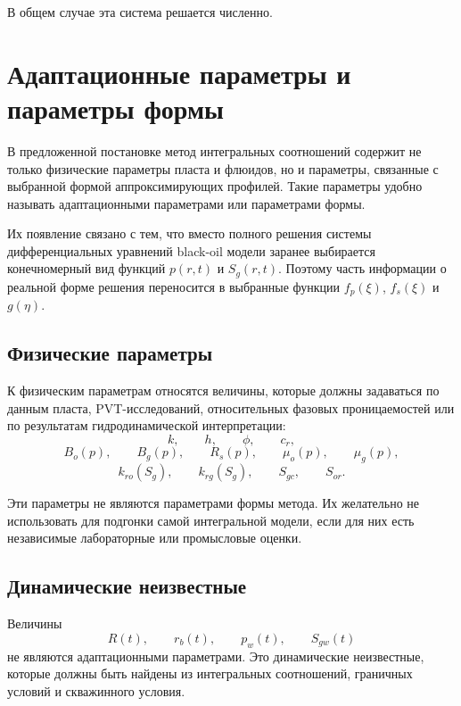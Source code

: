\documentclass[12pt,a4paper]{article}
\begin{document}
В общем случае эта система решается численно.


\section{Адаптационные параметры и параметры формы}

В предложенной постановке метод интегральных соотношений содержит не только физические параметры пласта и флюидов, но и параметры, связанные с выбранной формой аппроксимирующих профилей. Такие параметры удобно называть адаптационными параметрами или параметрами формы.

Их появление связано с тем, что вместо полного решения системы дифференциальных уравнений black-oil модели заранее выбирается конечномерный вид функций $p(r,t)$ и $S_g(r,t)$. Поэтому часть информации о реальной форме решения переносится в выбранные функции $f_p(\xi)$, $f_s(\xi)$ и $g(\eta)$.

\subsection{Физические параметры}

К физическим параметрам относятся величины, которые должны задаваться по данным пласта, PVT-исследований, относительных фазовых проницаемостей или по результатам гидродинамической интерпретации:
\begin{equation}
    k, \qquad h, \qquad \phi, \qquad c_r,
\end{equation}
\begin{equation}
    B_o(p), \qquad B_g(p), \qquad R_s(p), \qquad \mu_o(p), \qquad \mu_g(p),
\end{equation}
\begin{equation}
    k_{ro}(S_g), \qquad k_{rg}(S_g), \qquad S_{gc}, \qquad S_{or}.
\end{equation}

Эти параметры не являются параметрами формы метода. Их желательно не использовать для подгонки самой интегральной модели, если для них есть независимые лабораторные или промысловые оценки.

\subsection{Динамические неизвестные}

Величины
\begin{equation}
    R(t), \qquad r_b(t), \qquad p_w(t), \qquad S_{gw}(t)
\end{equation}
не являются адаптационными параметрами. Это динамические неизвестные, которые должны быть найдены из интегральных соотношений, граничных условий и скважинного условия.
\end{document}
